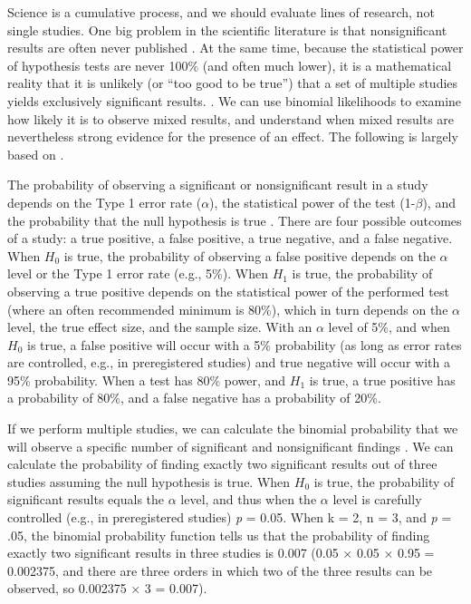 \documentclass[
  oneside]{book}
\begin{document}
Science is a cumulative process, and we should evaluate lines of research, not single studies. One big problem in the scientific literature is that nonsignificant results are often never published \citep{franco_publication_2014, fanelli_positive_2010}. At the same time, because the statistical power of hypothesis tests are never 100\% (and often much lower), it is a mathematical reality that it is unlikely (or ``too good to be true'') that a set of multiple studies yields exclusively significant results. \citep{schimmack_ironic_2012, francis_frequency_2014}. We can use binomial likelihoods to examine how likely it is to observe mixed results, and understand when mixed results are nevertheless strong evidence for the presence of an effect. The following is largely based on \citet{lakens_too_2017}.

The probability of observing a significant or nonsignificant result in a study depends on the Type 1 error rate (\(\alpha\)), the statistical power of the test (1-\(\beta\)), and the probability that the null hypothesis is true \citep{wacholder_assessing_2004}. There are four possible outcomes of a study: a true positive, a false positive, a true negative, and a false negative. When \(H_0\) is true, the probability of observing a false positive depends on the \(\alpha\) level or the Type 1 error rate (e.g., 5\%). When \(H_1\) is true, the probability of observing a true positive depends on the statistical power of the performed test (where an often recommended minimum is 80\%), which in turn depends on the \(\alpha\) level, the true effect size, and the sample size. With an \(\alpha\) level of 5\%, and when \(H_0\) is true, a false positive will occur with a 5\% probability (as long as error rates are controlled, e.g., in preregistered studies) and true negative will occur with a 95\% probability. When a test has 80\% power, and \(H_1\) is true, a true positive has a probability of 80\%, and a false negative has a probability of 20\%.

If we perform multiple studies, we can calculate the binomial probability that we will observe a specific number of significant and nonsignificant findings \citep{ioannidis_exploratory_2007}. We can calculate the probability of finding exactly two significant results out of three studies assuming the null hypothesis is true. When \(H_0\) is true, the probability of significant results equals the \(\alpha\) level, and thus when the \(\alpha\) level is carefully controlled (e.g., in preregistered studies) \emph{p} = 0.05. When k = 2, n = 3, and \emph{p} = .05, the binomial probability function tells us that the probability of finding exactly two significant results in three studies is 0.007 (0.05 × 0.05 × 0.95 = 0.002375, and there are three orders in which two of the three results can be observed, so 0.002375 × 3 = 0.007).
\end{document}
